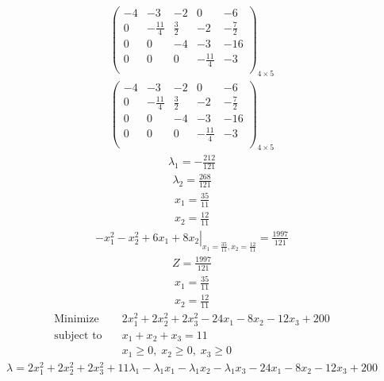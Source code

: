 \documentclass{article}
\begin{document}
\begin{align*}
\left(
\begin{array}{cccc|c}
-4 & -3 & -2 & 0 & -6\\
0 & -\frac{11}{4} & \frac{3}{2} & -2 & -\frac{7}{2}\\
0 & 0 & -4 & -3 & -16\\
0 & 0 & 0 & -\frac{11}{4} & -3\\
\end{array}
\right)_{4\times 5}
\end{align*}
\begin{align*}
\left(
\begin{array}{cccc|c}
-4 & -3 & -2 & 0 & -6\\
0 & -\frac{11}{4} & \frac{3}{2} & -2 & -\frac{7}{2}\\
0 & 0 & -4 & -3 & -16\\
0 & 0 & 0 & -\frac{11}{4} & -3\\
\end{array}
\right)_{4\times 5}
\end{align*}
\begin{align*}
\lambda_{1}=-\frac{212}{121}\end{align*}
\begin{align*}
\lambda_{2}=\frac{268}{121}\end{align*}
\begin{align*}
x_{1}=\frac{35}{11}\end{align*}
\begin{align*}
x_{2}=\frac{12}{11}\end{align*}
\begin{align*}
\left.-x_{1}^{2} - x_{2}^{2} + 6x_{1} + 8x_{2}\right|_{x_{1}=\frac{35}{11},x_{2}=\frac{12}{11}}=\frac{1997}{121}\end{align*}
\begin{align*}
Z=\frac{1997}{121}\end{align*}
\begin{align*}
x_{1}=\frac{35}{11}\end{align*}
\begin{align*}
x_{2}=\frac{12}{11}\end{align*}
\begin{align*}
\text{Minimize} \quad & 2x_{1}^{2} + 2x_{2}^{2} + 2x_{3}^{2} - 24x_{1} - 8x_{2} - 12x_{3} + 200\\
\text{subject to} \quad
& x_{1} + x_{2} + x_{3}=11\\
& x_{1}\ge0,\; x_{2}\ge0,\; x_{3}\ge0\end{align*}
\begin{align*}
\lambda=2x_{1}^{2} + 2x_{2}^{2} + 2x_{3}^{2} + 11\lambda_{1} - \lambda_{1}x_{1} - \lambda_{1}x_{2} - \lambda_{1}x_{3} - 24x_{1} - 8x_{2} - 12x_{3} + 200\end{align*}
\end{document}
